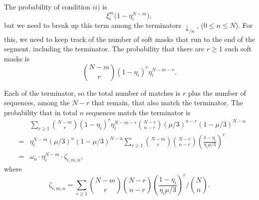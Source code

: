 \documentclass{article}
\begin{document}
The probability of condition $ii)$ is
\begin{equation*}
\xi_i^m \Big(1 - \eta_i^{N-m} \Big),
\end{equation*}
but we need to break up this term among the terminators $\downarrow_{/n}$,
($0 \leq n \leq N$). For this, we need to keep track of the number of soft
masks that run to the end of the segment, including the terminator. The
probability that there are $r \geq 1$ such soft masks is
\begin{equation*}
{N-m \choose r} (1 - \eta_i)^r \eta_i^{N-m-r}.
\end{equation*}

Each of the terminator, so the total number of matches is $r$ plus the
number of sequences, among the $N-r$ that remain, that also match the
terminator. The probability that in total $n$ sequences match the
terminator is
\begin{eqnarray*}
&\;& \sum_{r\geq1} {N-m \choose r} (1 - \eta_i)^r
\eta_i^{N-m-r} {N-r \choose n-r} (\mu/3)^{n-r} (1-\mu/3)^{N-n} \\
&=& \eta_i^{N-m} (\mu/3)^n(1-\mu/3)^{N-n}
  \sum_{r\geq1} {N-m \choose r} {N-r \choose n-r}
  \left( \frac{1-\eta_i}{\eta_i \mu/3} \right)^r \\
&=& \omega_n \cdot \eta_i^{N-m} \cdot \zeta_{i,m,n},
\end{eqnarray*}
where
\begin{equation}
\label{eq:zeta}
\zeta_{i,m,n} = \sum_{r\geq1}
{N-m \choose r} {N-r \choose n-r}
\left( \frac{1-\eta_i}{\eta_i \mu/3} \right)^r \bigg/ {N \choose n}.
\end{equation}
\end{document}
